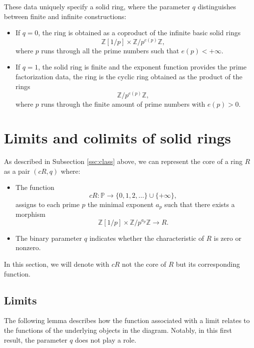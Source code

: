 \documentclass{amsart}
\newcommand{\Z}{{\mathbb Z}}
\renewcommand{\P}{{\mathbb P}}
\begin{document}
    These data uniquely specify a solid ring, where the parameter $q$ distinguishes between finite and infinite constructions:
    
    \begin{itemize}
        \item
        If $q = 0$, the ring is obtained as a coproduct of the infinite basic solid rings
        $$
        \Z[1/p] \times \Z/p^{e(p)}\Z,
        $$
        where $p$ runs through all the prime numbers such that $e(p) < +\infty$.

        \item 
        If $q = 1$, the solid ring is finite and the exponent function provides the prime factorization data, the ring is the cyclic ring obtained as the product of the rings
        $$
        \Z/p^{e(p)}\Z,
        $$
        where $p$ runs through the finite amount of prime numbers with $e(p) > 0$.
    \end{itemize}

    \section{Limits and colimits of solid rings}

    As described in Subsection \ref{ssc:class} above, we can represent the core of a ring $R$ as a pair $(cR, q)$ where:
    \begin{itemize}
        \item 
        The function
    $$
    cR: \P \to \{0, 1, 2, \dots\} \cup \{+\infty\},
    $$
    assigns to each prime $p$ the minimal exponent $a_p$ such that there exists a morphism
    $$
    \Z[1/p] \times \Z/p^{a_p}\Z \to R.
    $$
    
        \item 
    The binary parameter $q$ indicates whether the characteristic of $R$ is zero or nonzero.
    \end{itemize}
	
	In this section, we will denote with $cR$ not the core of $R$ but its corresponding function.

    \subsection{Limits}

    The following lemma describes how the function associated with a limit relates to the functions of the underlying objects in the diagram.
    Notably, in this first result, the parameter $q$ does not play a role.
\end{document}

